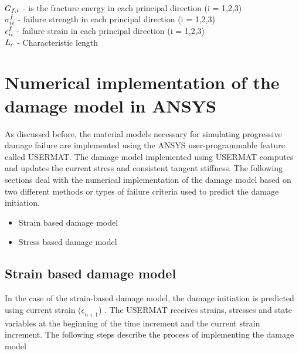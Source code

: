 \documentclass[12pt,a4paper,twoside,openright]{report}
\begin{document}
\\ 
\\ 
\\
$\mathlarger{G_{f,i}}$ \; - \;is the fracture energy in each principal direction (i = 1,2,3)  \\ $\mathlarger{\sigma_{ii}^{f}}$ \;\;\; -  \;  failure strength in each principal direction (i = 1,2,3) \\ $\mathlarger{\epsilon_{ii}^{f}}$\;\;\;\;\; - \; failure strain in each principal direction (i = 1,2,3) \\ $\mathlarger{L_{c}}$\;\;\;\;\; - \; Characteristic length

\section{Numerical implementation of the damage model in ANSYS}
\indent\indent\indent  As discussed before, the material models necessary for simulating progressive damage failure are implemented using the ANSYS user-programmable feature called USERMAT. The damage model implemented using USERMAT computes and updates the current stress and consistent tangent stiffness. The following sections deal with the numerical implementation of the damage model based on two different methods or types of failure criteria used to predict the damage initiation.
\\
\begin{itemize}
\item Strain based damage model 
\item Stress based damage model 
\end{itemize}
\subsection{Strain based damage model}\label{Strain based damage model}
\indent\indent\indent  In the case of the strain-based damage model, the damage initiation is predicted using current strain ($\underline{\epsilon}_{n+1}$) \citep{wang2009three}.   The USERMAT receives strains, stresses and state variables at the beginning of the time increment and the current strain increment. The following steps describe the process of implementing the damage model
\end{document}

